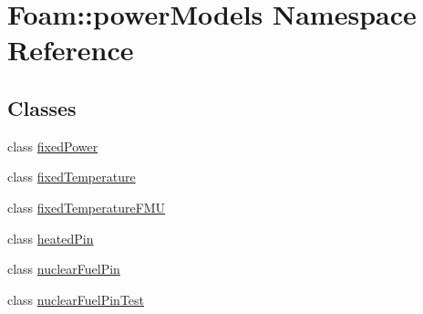 \hypertarget{namespaceFoam_1_1powerModels}{}\section{Foam\+:\+:power\+Models Namespace Reference}
\label{namespaceFoam_1_1powerModels}
\subsection*{Classes}
\begin{DoxyCompactItemize}
\item 
class \hyperlink{classFoam_1_1powerModels_1_1fixedPower}{fixed\+Power}
\item 
class \hyperlink{classFoam_1_1powerModels_1_1fixedTemperature}{fixed\+Temperature}
\item 
class \hyperlink{classFoam_1_1powerModels_1_1fixedTemperatureFMU}{fixed\+Temperature\+F\+MU}
\item 
class \hyperlink{classFoam_1_1powerModels_1_1heatedPin}{heated\+Pin}
\item 
class \hyperlink{classFoam_1_1powerModels_1_1nuclearFuelPin}{nuclear\+Fuel\+Pin}
\item 
class \hyperlink{classFoam_1_1powerModels_1_1nuclearFuelPinTest}{nuclear\+Fuel\+Pin\+Test}
\end{DoxyCompactItemize}
